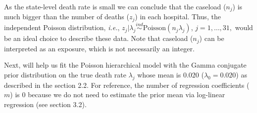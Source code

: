\documentclass[article]{jss}
\begin{document}
As the state-level death rate is small we can conclude that the caseload ($n_{j}$) is much bigger than the number of deaths ($z_{j}$) in each hospital. Thus, the independent Poisson distribution, \emph{i.e.},  $z_{j}\vert \lambda_{j}\stackrel{ind}{\sim} \textrm{Poisson}(n_{j}\lambda_{j})$, $j=1, \ldots, 31,$ would be an ideal choice to describe these data. Note that caseload  ($n_{j}$) can be interpreted as an exposure, which is not necessarily an integer.


Next,  will help us fit the Poisson hierarchical model with the Gamma conjugate prior distribution on the true death rate $\lambda_{j}$ whose mean is 0.020 ($\lambda_{0}=0.020$) as described in the section 2.2. For reference, the number of regression coefficients ($m$) is 0 because we do not need to estimate the prior mean via log-linear regression (see section 3.2).
\end{document}
